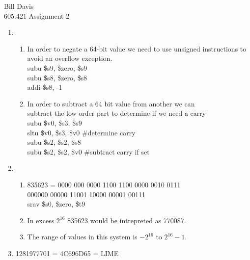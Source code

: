 \documentclass[11pt,fleqn]{article}
\begin{document}
\newcommand{\mbf}[1]{\mbox{{\bfseries #1}}}
\newcommand{\N}{\mbf{N}}
\renewcommand{\O}{\mbf{O}}

\noindent Bill Davis \\
605.421 Assignment 2

\begin{enumerate}
\item 
  \begin{enumerate}
  \item In order to negate a 64-bit value we need to use 
        unsigned instructions to avoid an overflow exception. \\
        subu \$s9, \$zero, \$s9 \\
        subu \$s8, \$zero, \$s8 \\          
        addi \$s8, -1                       
  \item 
        In order to subtract a 64 bit value from another we can\\
        subtract the low order part to determine if we need a carry \\
        subu \$v0, \$s3, \$s9                         \\
        sltu \$v0, \$s3, \$v0 \#determine carry       \\
        subu \$s2, \$s2, \$s8                         \\
        subu \$s2, \$s2, \$v0 \#subtract carry if set \\
           
  \end{enumerate}
\item 
  \begin{enumerate} 
    \item 835623 = 0000 000 0000 1100 1100 0000 0010 0111 \\
              000000 00000 11001 10000 00001 00111 \\
              srav \$s0, \$zero, \$t9
    \item In excess $2^{16}$ 835623 would be intrepreted as 
          770087.
    \item The range of values in this system is $-2^{16}$ to $2^{16}-1$.
              
 
  \end{enumerate}
\item 1281977701 = 4C696D65 = LIME


\end{enumerate}
\end{document}
